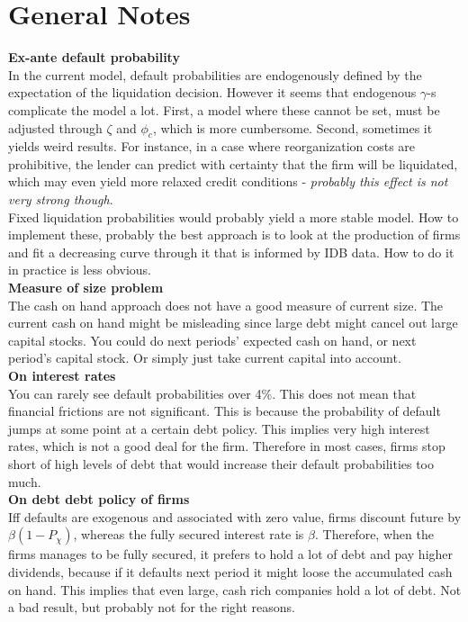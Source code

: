 \documentclass[12pt]{article}
\begin{document}
\section*{General Notes}
\textbf{Ex-ante default probability} \\ 
In the current model, default probabilities are endogenously defined by the expectation of the liquidation decision. However it seems that endogenous $\gamma$-s complicate the model a lot. First, a model where these cannot be set, must be adjusted through $\zeta$ and $\phi_c$, which is more cumbersome. Second, sometimes it yields weird results. For instance, in a case where reorganization costs are prohibitive, the lender can predict with certainty that the firm will be liquidated, which may even yield more relaxed credit conditions - \textit{probably this effect is not very strong though}. \vspace{3mm} \\
Fixed liquidation probabilities would probably yield a more stable model. How to implement these, probably the best approach is to look at the production of firms and fit a decreasing curve through it that is informed by IDB data. How to do it in practice is less obvious. \vspace{3mm} \\
\textbf{Measure of size problem} \\
The cash on hand approach does not have a good measure of current size. The current cash on hand might be misleading since large debt might cancel out large capital stocks. You could do next periods' expected cash on hand, or next period's capital stock. Or simply just take current capital into account. \vspace{3mm} \\
\textbf{On interest rates} \\
You can rarely see default probabilities over 4\%. This does not mean that financial frictions are not significant. This is because the probability of default jumps at some point at a certain debt policy. This implies very high interest rates, which is not a good deal for the firm. Therefore in most cases, firms stop short of high levels of debt that would increase their default probabilities too much. \vspace{3mm} \\
\textbf{On debt debt policy of firms} \\
Iff defaults are exogenous and associated with zero value, firms discount future by $\beta(1-P_\chi)$, whereas the fully secured interest rate is $\beta$. Therefore, when the firms manages to be fully secured, it prefers to hold a lot of debt and pay higher dividends, because if it defaults next period it might loose the accumulated cash on hand. This implies that even large, cash rich companies hold a lot of debt. Not a bad result, but probably not for the right reasons. \vspace{3mm} \\
\end{document}

